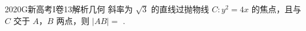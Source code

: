
\begin{problem}{2020}{G}{新高考I卷}{13}{解析几何}
斜率为 $ \sqrt{3} $ 的直线过抛物线 $ C:y^2=4x $ 的焦点，且与 $ C $ 交于 $ A $，$ B $ 两点，则 $ |AB|= $ \underline{\hspace{4em}}.
\end{problem}

\begin{answer}

\end{answer}

\begin{solutions}

\end{solutions}